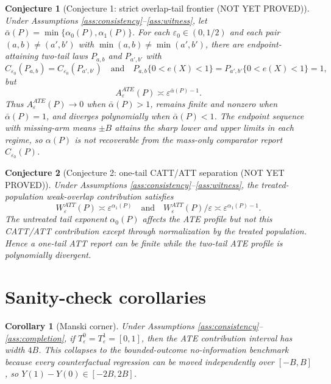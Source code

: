 \documentclass[11pt]{article}
\theoremstyle{definition}
\theoremstyle{plain}
\newtheorem{conjecture}{Conjecture}
\newtheorem{corollary}{Corollary}
\theoremstyle{remark}
\begin{document}
\begin{conjecture}[Conjecture 1: strict overlap-tail frontier (NOT YET PROVED)]\label{conj:two-tail-phase}
Under Assumptions \ref{ass:consistency}--\ref{ass:witness}, let
\(\bar\alpha(P)=\min\{\alpha_0(P),\alpha_1(P)\}\). For each
\(\varepsilon_0\in(0,1/2)\) and each pair
\((a,b)\neq(a',b')\) with \(\min(a,b)\neq\min(a',b')\), there are endpoint-attaining
two-tail laws \(P_{a,b}\) and \(P_{a',b'}\) with
\[
C_{\varepsilon_0}(P_{a,b})=C_{\varepsilon_0}(P_{a',b'})
\quad\text{and}\quad
P_{a,b}\{0<e(X)<1\}=P_{a',b'}\{0<e(X)<1\}=1,
\]
but
\[
A_\varepsilon^{ATE}(P)\asymp \varepsilon^{\bar\alpha(P)-1}.
\]
Thus \(A_\varepsilon^{ATE}(P)\to0\) when \(\bar\alpha(P)>1\), remains finite and nonzero
when \(\bar\alpha(P)=1\), and diverges polynomially when \(\bar\alpha(P)<1\). The
endpoint sequence with missing-arm means \(\pm B\) attains the sharp lower and upper
limits in each regime, so \(\alpha(P)\) is not recoverable from the mass-only comparator
report \(C_{\varepsilon_0}(P)\).
\end{conjecture}

\begin{conjecture}[Conjecture 2: one-tail CATT/ATT separation (NOT YET PROVED)]\label{conj:one-tail-separation}
Under Assumptions \ref{ass:consistency}--\ref{ass:witness}, the treated-population
weak-overlap contribution satisfies
\[
W_\varepsilon^{ATT}(P)\asymp \varepsilon^{\alpha_1(P)}
\quad\text{and}\quad
W_\varepsilon^{ATT}(P)/\varepsilon\asymp
\varepsilon^{\alpha_1(P)-1}.
\]
The untreated tail exponent \(\alpha_0(P)\) affects the ATE profile but not this CATT/ATT
contribution except through normalization by the treated population. Hence a one-tail
ATT report can be finite while the two-tail ATE profile is polynomially divergent.
\end{conjecture}

\section{Sanity-check corollaries}
\begin{corollary}[Manski corner]\label{cor:manski-corner}
Under Assumptions \ref{ass:consistency}--\ref{ass:completion}, if
\(T_\varepsilon^0=T_\varepsilon^1=[0,1]\), then the ATE contribution interval has width \(4B\). This collapses
to the bounded-outcome no-information benchmark because every counterfactual regression
can be moved independently over \([-B,B]\), so \(Y(1)-Y(0)\in[-2B,2B]\).
\end{corollary}
\end{document}
